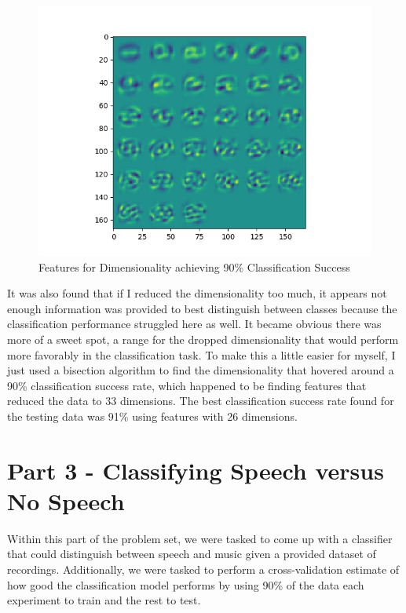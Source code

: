 \documentclass{article}[12pt]
\begin{document}
\begin{figure}[ht]
	\centerline{
		\includegraphics[scale=0.7]{../scripts/p2/resulting_features.png}}
	\caption{Features for Dimensionality achieving 90\% Classification Success}
	\label{fig:p2ftrs}
\end{figure}

   It was also found that if I reduced the dimensionality too much, it appears not enough information was provided to best distinguish between classes because the classification performance struggled here as well. It became obvious there was more of a sweet spot, a range for the dropped dimensionality that would perform more favorably in the classification task. To make this a little easier for myself, I just used a bisection algorithm to find the dimensionality that hovered around a 90\% classification success rate, which happened to be finding features that reduced the data to 33 dimensions. The best classification success rate found for the testing data was 91\% using features with 26 dimensions.

	\newpage
   \section{Part 3 - Classifying Speech versus No Speech}
   Within this part of the problem set, we were tasked to come up with a classifier that could distinguish between speech and music given a provided dataset of recordings. Additionally, we were tasked to perform a cross-validation estimate of how good the classification model performs by using 90\% of the data each experiment to train and the rest to test. 
   
\end{document}
